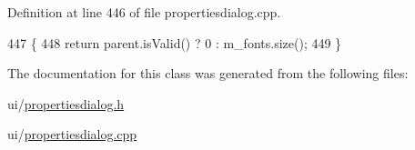 Definition at line 446 of file propertiesdialog.\+cpp.


\begin{DoxyCode}
447 \{
448     \textcolor{keywordflow}{return} parent.isValid() ? 0 : m\_fonts.size();
449 \}
\end{DoxyCode}


The documentation for this class was generated from the following files\+:\begin{DoxyCompactItemize}
\item 
ui/\hyperlink{propertiesdialog_8h}{propertiesdialog.\+h}\item 
ui/\hyperlink{propertiesdialog_8cpp}{propertiesdialog.\+cpp}\end{DoxyCompactItemize}
